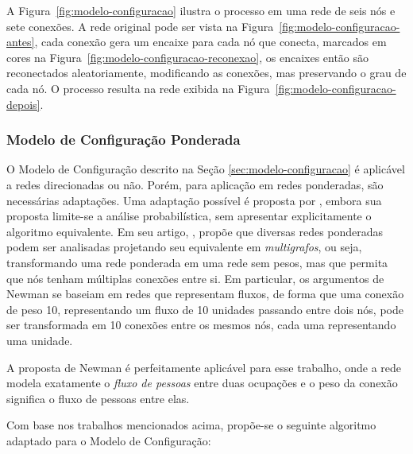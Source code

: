\documentclass[12pt,a4paper,final]{article}
\begin{document}
A Figura~\ref{fig:modelo-configuracao} ilustra o processo em uma rede de seis nós e sete conexões. A rede original pode ser vista na Figura~\ref{fig:modelo-configuracao-antes}, cada conexão gera um encaixe para cada nó que conecta, marcados em cores na Figura~\ref{fig:modelo-configuracao-reconexao}, os encaixes então são reconectados aleatoriamente, modificando as conexões, mas preservando o grau de cada nó. O processo resulta na rede exibida na Figura~\ref{fig:modelo-configuracao-depois}.


\subsubsection{Modelo de Configuração Ponderada} \label{sec:modelo-configuracao-ponderada}

O Modelo de Configuração descrito na Seção \ref{sec:modelo-configuracao} é aplicável a redes direcionadas ou não. Porém, para aplicação em redes ponderadas, são necessárias adaptações. Uma adaptação possível é proposta por , embora sua proposta limite-se a análise probabilística, sem apresentar explicitamente o algoritmo equivalente. Em seu artigo, , propõe que diversas redes ponderadas podem ser analisadas projetando seu equivalente em \textit{multigrafos}, ou seja, transformando uma rede ponderada em uma rede sem pesos, mas que permita que nós tenham múltiplas conexões entre si. Em particular, os argumentos de Newman se baseiam em redes que representam fluxos, de forma que uma conexão de peso 10, representando um fluxo de 10 unidades passando entre dois nós, pode ser transformada em 10 conexões entre os mesmos nós, cada uma representando uma unidade.

A proposta de Newman é perfeitamente aplicável para esse trabalho, onde a rede modela exatamente o \textit{fluxo de pessoas} entre duas ocupações e o peso da conexão significa o fluxo de pessoas entre elas.

Com base nos trabalhos mencionados acima, propõe-se o seguinte algoritmo adaptado para o Modelo de Configuração:
\end{document}
